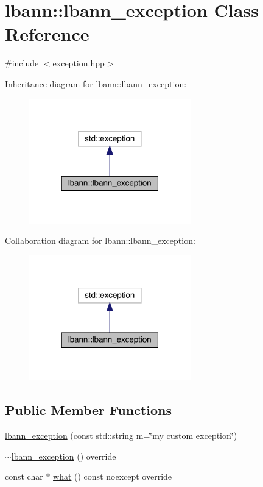 \hypertarget{classlbann_1_1lbann__exception}{}\section{lbann\+:\+:lbann\+\_\+exception Class Reference}
\label{classlbann_1_1lbann__exception}


{\ttfamily \#include $<$exception.\+hpp$>$}



Inheritance diagram for lbann\+:\+:lbann\+\_\+exception\+:\nopagebreak
\begin{figure}[H]
\begin{center}
\leavevmode
\includegraphics[width=199pt]{classlbann_1_1lbann__exception__inherit__graph}
\end{center}
\end{figure}


Collaboration diagram for lbann\+:\+:lbann\+\_\+exception\+:\nopagebreak
\begin{figure}[H]
\begin{center}
\leavevmode
\includegraphics[width=199pt]{classlbann_1_1lbann__exception__coll__graph}
\end{center}
\end{figure}
\subsection*{Public Member Functions}
\begin{DoxyCompactItemize}
\item 
\hyperlink{classlbann_1_1lbann__exception_adbbe5260b3e3bd951ed2cb9363040f4a}{lbann\+\_\+exception} (const std\+::string m=\char`\"{}my custom exception\char`\"{})
\item 
\hyperlink{classlbann_1_1lbann__exception_aac6b1cde216d2ba2d5becc11c17dfb2e}{$\sim$lbann\+\_\+exception} () override
\item 
const char $\ast$ \hyperlink{classlbann_1_1lbann__exception_ad36592ddd0ff6a24f31ec6a31b83e920}{what} () const noexcept override
\end{DoxyCompactItemize}
